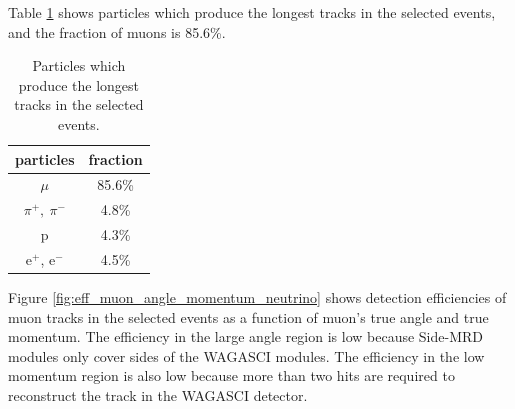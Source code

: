 Table \ref{tab:longest_track_particle} shows particles which produce the longest tracks in the selected events, and the fraction of muons is 85.6\%.

\begin{table}[htb]
  \begin{center}
    \caption{Particles which produce the longest tracks in the selected events.}
    \begin{tabular}{cc} \hline
      particles & fraction \\ \hline
      $\mu$ & 85.6\% \\
      $\pi^{+},\ \pi^{-}$ & 4.8\% \\
      p & 4.3\% \\
      e$^{+}$, e$^{-}$ & 4.5\% \\
      \hline
    \end{tabular}
    \label{tab:longest_track_particle}
  \end{center}
\end{table}


Figure \ref{fig:eff_muon_angle_momentum_neutrino} shows detection efficiencies of muon tracks in the selected events as a function of muon's true angle and true momentum.
The efficiency in the large angle region is low because Side-MRD modules only cover sides of the WAGASCI modules.
The efficiency in the low momentum region is also low because more than two hits  are required to reconstruct the track in the WAGASCI detector.

